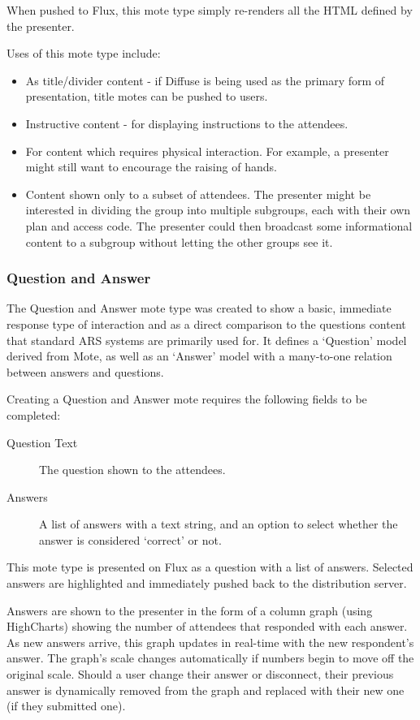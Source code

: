 \documentclass[a4papert,11pt,notitlepage]{ltxdoc}
\begin{document}
When pushed to Flux, this mote type simply re-renders all the HTML defined by the presenter.

Uses of this mote type include:
\begin{itemize}
\item As title/divider content - if Diffuse is being used as the primary form of presentation, title motes can be pushed to users.
\item Instructive content - for displaying instructions to the attendees.
\item For content which requires physical interaction. For example, a presenter might still want to encourage the raising of hands.
\item Content shown only to a subset of attendees. The presenter might be interested in dividing the group into multiple subgroups, each with their own plan and access code. The presenter could then broadcast some informational content to a subgroup without letting the other groups see it.
\end{itemize}

\subsubsection{Question and Answer}
The Question and Answer mote type was created to show a basic, immediate response type of interaction and as a direct comparison to the questions content that standard ARS systems are primarily used for. It defines a `Question' model derived from Mote, as well as an `Answer' model with a many-to-one relation between answers and questions.

Creating a Question and Answer mote requires the following fields to be completed:
\begin{description}
\item[Question Text] The question shown to the attendees.
\item[Answers] A list of answers with a text string, and an option to select whether the answer is considered `correct' or not.
\end{description}

This mote type is presented on Flux as a question with a list of answers. Selected answers are highlighted and immediately pushed back to the distribution server.

Answers are shown to the presenter in the form of a column graph (using HighCharts) showing the number of attendees that responded with each answer. As new answers arrive, this graph updates in real-time with the new respondent's answer. The graph's scale changes automatically if numbers begin to move off the original scale. Should a user change their answer or disconnect, their previous answer is dynamically removed from the graph and replaced with their new one (if they submitted one).
\end{document}
